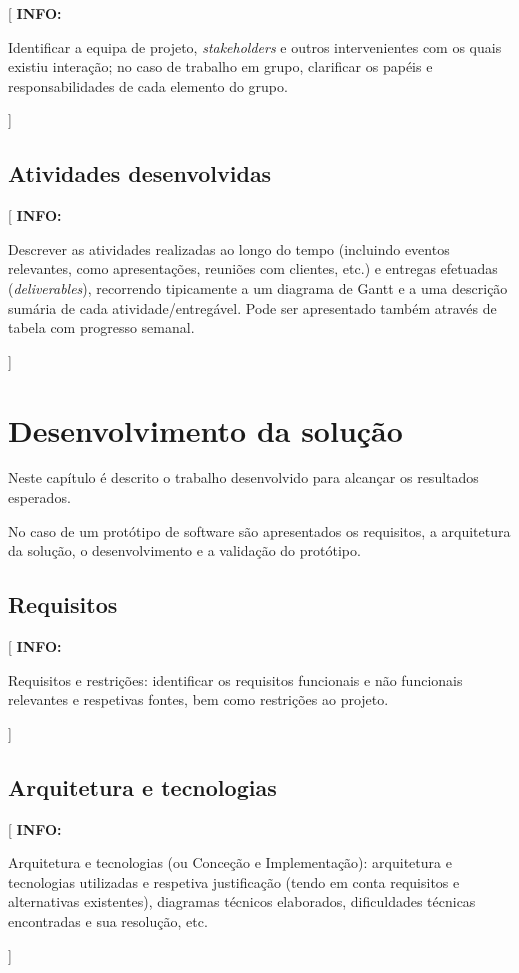 \documentclass[11pt,a4paper]{report}
\newenvironment{info}[1]{\vspace*{6mm}\color{blue}[ \textbf{INFO:} \begin{em} #1}
                        {\vspace*{3mm}\end{em} ]}
\begin{document}
\begin{info}
Identificar a equipa de projeto, \emph{stakeholders} e outros
intervenientes com os quais existiu interação; no caso de trabalho em
grupo, clarificar os papéis e responsabilidades de cada elemento do grupo.
\end{info}

\section{Atividades desenvolvidas}

\begin{info}
Descrever as atividades realizadas ao longo do tempo (incluindo
eventos relevantes, como apresentações, reuniões com clientes, etc.)
e entregas efetuadas (\emph{deliverables}), recorrendo tipicamente a
um diagrama de Gantt e a uma descrição sumária de cada
atividade/entregável.
Pode ser apresentado também através de tabela com progresso semanal.
\end{info}


\chapter{Desenvolvimento da solução}

Neste capítulo é descrito o trabalho desenvolvido para alcançar os
resultados esperados.

No caso de um protótipo de software são apresentados os requisitos, a
arquitetura da solução, o desenvolvimento e a validação do protótipo.

\section{Requisitos}

\begin{info}
Requisitos e restrições: identificar os requisitos funcionais e não
funcionais relevantes e respetivas fontes, bem como restrições ao projeto. 
\end{info}

\section{Arquitetura e tecnologias}

\begin{info}
Arquitetura e tecnologias (ou Conceção e Implementação): arquitetura e
tecnologias utilizadas e respetiva justificação (tendo em conta
requisitos e alternativas existentes), diagramas técnicos elaborados,
dificuldades técnicas encontradas e sua resolução, etc. 
\end{info}
\end{document}
